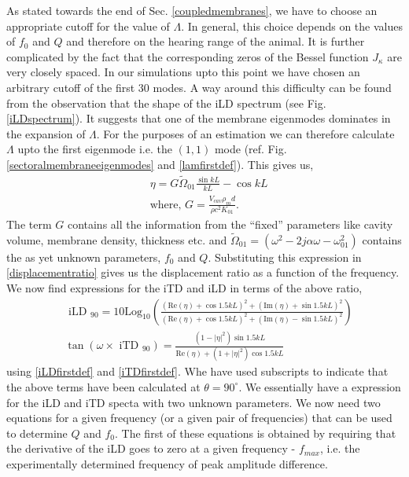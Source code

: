 As stated towards the end
of Sec. \ref{coupledmembranes}, we have to choose an appropriate cutoff for the value of $\Lambda$. In general, this choice
depends on the values of $f_0$ and $Q$ and therefore on the hearing range of the animal. It is further complicated by
the fact that the corresponding zeros of the Bessel function $J_\kappa$ are very closely spaced. In our simulations upto this point
we have chosen an arbitrary cutoff of the first $30$ modes. A way around this difficulty can be found from the observation that the shape
of the iLD spectrum (see Fig. \ref{iLDspectrum}). It suggests that one of the membrane eigenmodes dominates in the expansion of $\Lambda$. 
For the purposes of an estimation 
we can therefore calculate $\Lambda$ upto the first eigenmode i.e. the $(1,1)$ mode (ref. Fig. \ref{sectoralmembraneeigenmodes} and \eqref{lamfirstdef}).
This gives us,
\begin{align}
 &\eta=G\widetilde{\Omega}_{01}\frac{\sin kL}{kL}-\cos kL\\
 &\mbox{where, }G=\frac{V_{cav}\rho_md}{\rho c^2 K_{01}}\nonumber.
\end{align}
The term $G$ contains all the information from the ``fixed'' parameters like cavity volume, membrane density, thickness etc. and
$\widetilde{\Omega}_{01}=(\omega^2-2j\alpha\omega-\omega^2_{01})$ contains the as yet unknown parameters, $f_0$ and $Q$. Substituting
this expression in \eqref{displacementratio} gives us the displacement ratio as a function of the frequency. 
We now find expressions for the iTD and iLD in terms of the above ratio,
\begin{align}
 &\mbox{ iLD }_{90}= 10\mbox{Log}_{10}\left(\frac{(\mbox{Re}(\eta)+\cos 1.5kL)^2+(\mbox{Im}(\eta)+\sin 1.5kL)^2}{(\mbox{Re}(\eta)+\cos 1.5kL)^2+(\mbox{Im}(\eta)-\sin 1.5kL)^2}\right)\label{iLDnewdef}\\
 &\tan\left(\omega\times\mbox{ iTD }_{90}\right)= \frac{(1-|\eta|^2)\sin 1.5kL}{\mbox{Re}(\eta)+(1+|\eta|^2)\cos 1.5kL}\label{iTDnewdef}
\end{align}
using \eqref{iLDfirstdef} and \eqref{iTDfirstdef}. Whe have used subscripts to indicate that the above terms have been calculated
at $\theta = 90^\circ$. We essentially have 
a expression for the iLD and iTD specta with two unknown parameters. We now need two equations for a given frequency (or a given
pair of frequencies) that can be used to determine $Q$ and $f_0$. The first of these equations is obtained by requiring that
the derivative of the iLD goes to zero at a given frequency - $f_{max}$, i.e. the experimentally determined frequency of 
peak amplitude difference.


